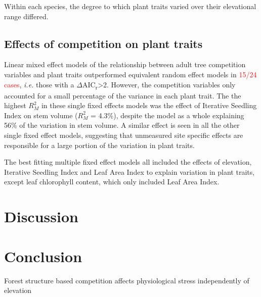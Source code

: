 \documentclass[a4paper,11pt]{article}
\newcommand{\todo}[1]{\textcolor{red}{#1}}   %
\begin{document}
Within each species, the degree to which plant traits varied over their elevational range differed.



\subsection{Effects of competition on plant traits}

Linear mixed effect models of the relationship between adult tree competition variables and plant traits outperformed equivalent random effect models in \todo{15/24 cases}, \textit{i.e.} those with a $\Delta$AIC\textsubscript{r}>2. However, the competition variables only accounted for a small percentage of the variance in each plant trait. The the highest $R_M^2$ in these single fixed effects models was the effect of Iterative Seedling Index on stem volume ($R_M^2$ = 4.3\%), despite the model as a whole explaining 56\% of the variation in stem volume. A similar effect is seen in all the other single fixed effect models, suggesting that unmeasured site specific effects are responsible for a large portion of the variation in plant traits.

The best fitting multiple fixed effect models all included the effects of elevation, Iterative Seedling Index and Leaf Area Index to explain variation in plant traits, except leaf chlorophyll content, which only included Leaf Area Index. 


\section*{Discussion}

\section*{Conclusion}


Forest structure based competition affects physiological stress independently of elevation

\end{document}
